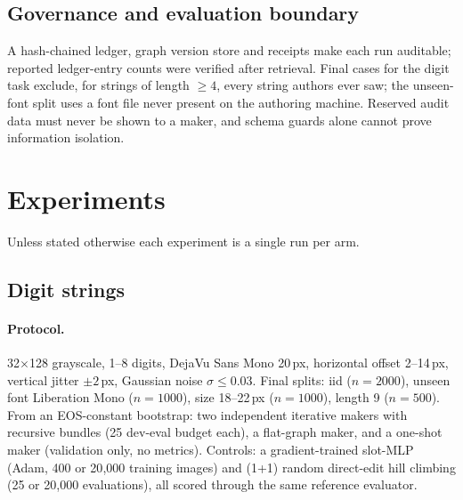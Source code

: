 \documentclass[11pt]{article}
\begin{document}
\subsection{Governance and evaluation boundary}
A hash-chained ledger, graph version store and receipts make each run auditable; reported
ledger-entry counts were verified after retrieval. Final cases for the digit task exclude, for
strings of length $\geq4$, every string authors ever saw; the unseen-font split uses a font file
never present on the authoring machine. Reserved audit data must never be shown to a maker, and
schema guards alone cannot prove information isolation.

\section{Experiments}
Unless stated otherwise each experiment is a single run per arm.

\subsection{Digit strings}\label{sec:exp1}
\paragraph{Protocol.} 32$\times$128 grayscale, 1--8 digits, DejaVu Sans Mono 20\,px, horizontal
offset 2--14\,px, vertical jitter $\pm2$\,px, Gaussian noise $\sigma\leq0.03$.
Final splits: iid ($n=2000$), unseen font Liberation Mono ($n=1000$), size 18--22\,px
($n=1000$), length 9 ($n=500$). From an EOS-constant bootstrap: two independent iterative makers
with recursive bundles (25 dev-eval budget each), a flat-graph maker, and a one-shot maker
(validation only, no metrics). Controls: a gradient-trained slot-MLP (Adam, 400 or 20{,}000
training images) and (1+1) random direct-edit hill climbing (25 or 20{,}000 evaluations), all
scored through the same reference evaluator.
\end{document}
